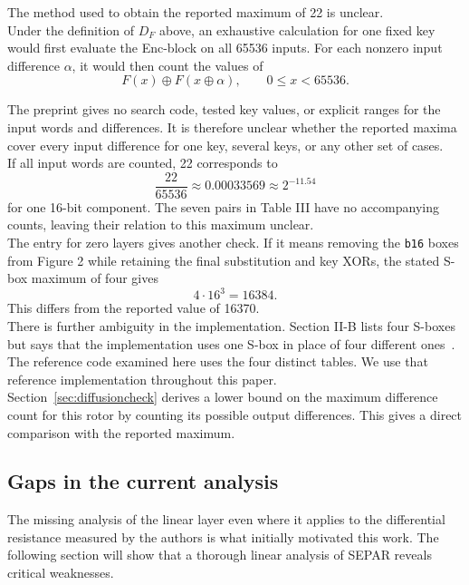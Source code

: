 \documentclass[11pt]{article}
\newcommand{\xor}{\mathbin\oplus}
\begin{document}
The method used to obtain the reported maximum of 22 is unclear.\\

Under the definition of \(D_F\) above, an exhaustive calculation for one
fixed key would first evaluate the Enc-block on all 65536
inputs. For each nonzero input difference \(\alpha\), it would then count
the values of
\[
 F(x)\xor F(x\xor\alpha),\qquad 0\le x<65536.
\]


The preprint gives no search code, tested key values, or explicit ranges for the input words
and differences. It is therefore unclear whether the reported maxima
cover every input difference for one key, several keys, or any other
set of cases.\\

If all input words are counted, 22 corresponds to
\[
 \frac{22}{65536}\approx0.00033569\approx2^{-11.54}
\]
for one 16-bit component. The seven pairs in Table III have no accompanying
counts, leaving their relation to this maximum unclear.\\

The entry for zero layers gives another check. If it
means removing the \texttt{b16} boxes from Figure 2 while retaining the
final substitution and key XORs, the stated S-box maximum of four gives
\[
 4\cdot16^3=16384.
\]
This differs from the reported value of 16370.\\

There is further ambiguity in the implementation. Section II-B lists
four S-boxes but says that the implementation uses one S-box in place of
four different ones~\cite{separ-differential}. The reference code examined
here uses the four distinct tables. We use that reference implementation
throughout this paper.\\


Section~\ref{sec:diffusioncheck} derives a lower bound on the maximum
difference count for this rotor by counting its possible output
differences. This gives a direct comparison with the reported maximum.

\subsection{Gaps in the current analysis}
The missing analysis of the linear layer even where it applies to the differential resistance measured by the authors is what initially motivated this work. The following section will show that a thorough linear analysis of SEPAR reveals critical weaknesses.
\end{document}
